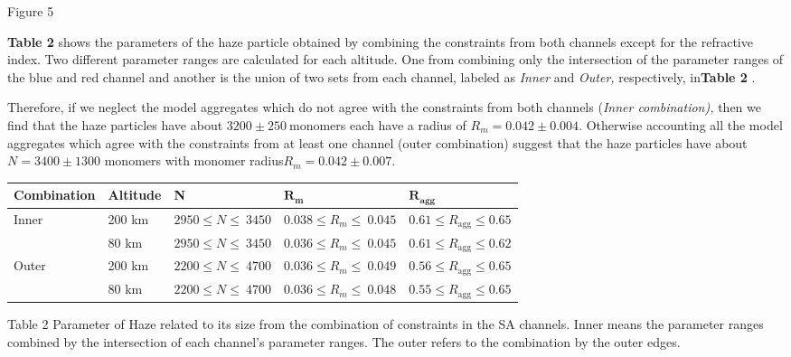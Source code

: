 \documentclass[final,5p,times,twocolumn]{elsarticle}
\begin{document}
Figure 5

\textbf{Table 2} shows the parameters of the haze particle obtained by
combining the constraints from both channels except for the refractive
index. Two different parameter ranges are calculated for each altitude.
One from combining only the intersection of the parameter ranges of the
blue and red channel and another is the union of two sets from each
channel, labeled as \emph{Inner} and \emph{Outer,} respectively,
in\textbf{Table 2} .

Therefore, if we neglect the model aggregates which do not agree with
the constraints from both channels (\emph{Inner combination),} then we
find that the haze particles have about \(3200\pm 250\ \)monomers each
have a radius of \(R_{m}=0.042\pm 0.004\). Otherwise accounting all the model
aggregates which agree with the constraints from at least one channel
(outer combination) suggest that the haze particles have
about\(N=3400\pm 1300\) monomers with monomer radius\(R_{m}=0.042\pm 0.007\).
\begin{longtable}[]{@{}lllll@{}}
\toprule
Combination & Altitude & N & \(\mathbf{R}_{\mathbf{m}}\) &
\(\mathbf{R}_{\mathbf{\text{agg}}}\)\tabularnewline
\midrule
\endhead
Inner & 200 km & \(2950\leq N\leq\ 3450\) & \(0.038\leq R_{m}\leq\ 0.045\) &
\(0.61\leq R_{\text{agg}}\leq 0.65\)\tabularnewline
& 80 km & \(2950\leq N\leq\ 3450\) & \(0.036\leq R_{m}\leq\ 0.045\) &
\(0.61\leq R_{\text{agg}}\leq 0.62\)\tabularnewline
Outer & 200 km & \(2200\leq N\leq\ 4700\) & \(0.036\leq R_{m}\leq\ 0.049\) &
\(0.56\leq R_{\text{agg}}\leq 0.65\)\tabularnewline
& 80 km & \(2200\leq N\leq\ 4700\) & \(0.036\leq R_{m}\leq\ 0.048\) &
\(0.55\leq R_{\text{agg}}\leq 0.65\)\tabularnewline
\bottomrule
\end{longtable}

Table 2 Parameter of Haze related to its size from the combination of
constraints in the SA channels. Inner means the parameter ranges
combined by the intersection of each channel's parameter ranges. The
outer refers to the combination by the outer edges.
\end{document}
